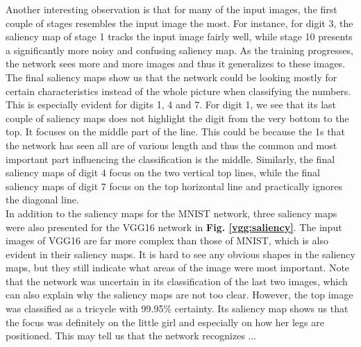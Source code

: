 \noindent Another interesting observation is that for many of the input images, the first couple of stages resembles the input image the most. For instance, for digit 3, the saliency map of stage 1 tracks the input image fairly well, while stage 10 presents a significantly more noisy and confusing saliency map. As the training progresses, the network sees more and more images and thus it generalizes to these images. The final saliency maps show us that the network could be looking mostly for certain characteristics instead of the whole picture when classifying the numbers. This is especially evident for digits 1, 4 and 7. For digit 1, we see that its last couple of saliency maps does not highlight the digit from the very bottom to the top. It focuses on the middle part of the line. This could be because the 1s that the network has seen all are of various length and thus the common and most important part influencing the classification is the middle. Similarly, the final saliency maps of digit 4 focus on the two vertical top lines, while the final saliency maps of digit 7 focus on the top horizontal line and practically ignores the diagonal line. \\

\noindent In addition to the saliency maps for the MNIST network, three saliency maps were also presented for the VGG16 network in \textbf{Fig. \ref{vgg:saliency}}. The input images of VGG16 are far more complex than those of MNIST, which is also evident in their saliency maps. It is hard to see any obvious shapes in the saliency maps, but they still indicate what areas of the image were most important. Note that the network was uncertain in its classification of the last two images, which can also explain why the saliency maps are not too clear. However, the top image was classified as a tricycle with 99.95\% certainty. Its saliency map shows us that the focus was definitely on the little girl and especially on how her legs are positioned. This may tell us that the network recognizes ...





